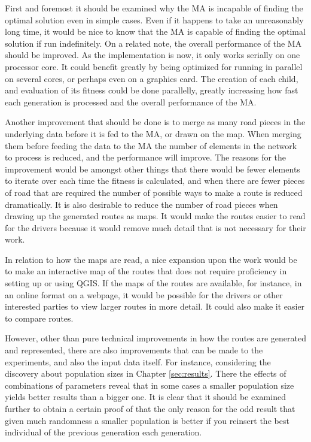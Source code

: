 First and foremost it should be examined why the MA is incapable of finding the optimal solution even in simple cases. Even if it happens to take an unreasonably long time, it would be nice to know that the MA is capable of finding the optimal solution if run indefinitely. On a related note, the overall performance of the MA should be improved. As the implementation is now, it only works serially on one processor core. It could benefit greatly by being optimized for running in parallel on several cores, or perhaps even on a graphics card. The creation of each child, and evaluation of its fitness could be done parallelly, greatly increasing how fast each generation is processed and the overall performance of the MA.

Another improvement that should be done is to merge as many road pieces in the underlying data before it is fed to the MA, or drawn on the map. When merging them before feeding the data to the MA the number of elements in the network to process is reduced, and the performance will improve. The reasons for the improvement would be amongst other things that there would be fewer elements to iterate over each time the fitness is calculated, and when there are fewer pieces of road that are required the number of possible ways to make a route is reduced dramatically. It is also desirable to reduce the number of road pieces when drawing up the generated routes as maps. It would make the routes easier to read for the drivers because it would remove much detail that is not necessary for their work.

In relation to how the maps are read, a nice expansion upon the work would be to make an interactive map of the routes that does not require proficiency in setting up or using QGIS. If the maps of the routes are available, for instance, in an online format on a webpage, it would be possible for the drivers or other interested parties to view larger routes in more detail. It could also make it easier to compare routes.

However, other than pure technical improvements in how the routes are generated and represented, there are also improvements that can be made to the experiments, and also the input data itself. 
For instance, considering the discovery about population sizes in Chapter \ref{sec:results}. There the effects of combinations of parameters reveal that in some cases a smaller population size yields better results than a bigger one. It is clear that it should be examined further to obtain a certain proof of that the only reason for the odd result that given much randomness a smaller population is better if you reinsert the best individual of the previous generation each generation.

